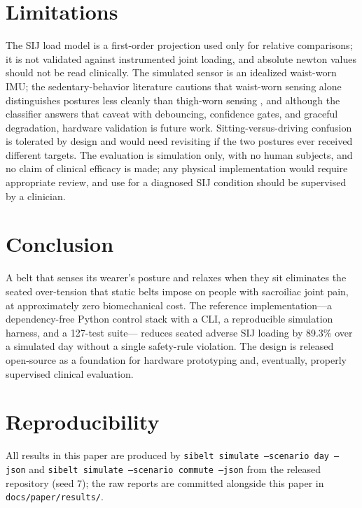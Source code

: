 \documentclass[11pt]{article}
\begin{document}
\section{Limitations}
The SIJ load model is a first-order projection used only for relative
comparisons; it is not validated against instrumented joint loading,
and absolute newton values should not be read clinically. The simulated
sensor is an idealized waist-worn IMU; the sedentary-behavior
literature cautions that waist-worn sensing alone distinguishes
postures less cleanly than thigh-worn sensing \cite{ref23}, and
although the classifier answers that caveat with debouncing, confidence
gates, and graceful degradation, hardware validation is future work.
Sitting-versus-driving confusion is tolerated by design and would need
revisiting if the two postures ever received different targets. The
evaluation is simulation only, with no human subjects, and no claim of
clinical efficacy is made; any physical implementation would require
appropriate review, and use for a diagnosed SIJ condition should be
supervised by a clinician.

\section{Conclusion}
A belt that senses its wearer's posture and relaxes when they sit
eliminates the seated over-tension that static belts impose on people
with sacroiliac joint pain, at approximately zero biomechanical cost.
The reference implementation---a dependency-free Python control stack
with a CLI, a reproducible simulation harness, and a 127-test suite---
reduces seated adverse SIJ loading by 89.3\% over a simulated
day without a single safety-rule violation. The design is released
open-source as a foundation for hardware prototyping and, eventually,
properly supervised clinical evaluation.

\section*{Reproducibility}
All results in this paper are produced by
\texttt{sibelt simulate --scenario day --json} and
\texttt{sibelt simulate --scenario commute --json} from the released
repository (seed 7); the raw reports are committed alongside this
paper in \texttt{docs/paper/results/}.



\end{document}

